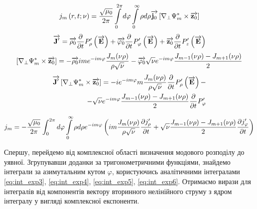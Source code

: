 \textcolor{blue} { \begin{equation*}
j_m \left( r, t; \nu \right) = \frac{\sqrt{\mu_0}}{2\pi} 
\int \limits_{0}^{2\pi} d \varphi \int \limits_0^\infty \rho d \rho 
\overrightarrow{\mathbf j_0} \left[  \nabla_\perp \Psi_m^*  \times  \overrightarrow{\mathbf z_0}  \right]
\end{equation*} }
%
\textcolor{blue} { \begin{equation*} 
\overrightarrow{\mathbf J^\prime} = 
\overrightarrow{\mathbf \rho_0}    \frac{\partial }{\partial t} P_\rho^\prime    \left( \overrightarrow{\mathbf E} \right) + 
\overrightarrow{\mathbf \varphi_0} \frac{\partial }{\partial t} P_\varphi^\prime \left( \overrightarrow{\mathbf E} \right) + 
\overrightarrow{\mathbf z_0}       \frac{\partial }{\partial t} P_z^\prime       \left( \overrightarrow{\mathbf E} \right) 
\end{equation*} }
%
\textcolor{blue} { \begin{equation*} \begin{aligned}
\left[  \nabla_\perp \Psi_m^*  \times  \overrightarrow{\mathbf z_0}  \right] =
- \overrightarrow{\mathbf \rho_0} i m e^{-im\varphi} \frac{J_m (\nu \rho)}{\rho \sqrt{\nu}}
- \overrightarrow{\mathbf \varphi_0} \sqrt{\nu} e^{-im\varphi} 
\frac{J_{m-1} (\nu \rho) - J_{m+1} (\nu \rho)}{2}
\end{aligned} \end{equation*} }
%
\textcolor{blue} { \begin{equation*} \begin{aligned}
\overrightarrow{\mathbf J^\prime} \left[  \nabla_\perp \Psi_m^*  \times  \overrightarrow{\mathbf z_0}  \right] = 
- i e^{-im\varphi} m \frac{J_m (\nu \rho)}{\rho \sqrt{\nu}}
\frac{\partial }{\partial t} P_\rho^\prime \left( \overrightarrow{\mathbf E} \right) - \\
- \sqrt{\nu} e^{-im\varphi} \frac{J_{m-1} (\nu \rho) - J_{m+1} (\nu \rho)}{2}
\frac{\partial }{\partial t} P_\varphi^\prime
\end{aligned} \end{equation*} }

\begin{equation*} \begin{aligned}
j_m = - \frac{\sqrt{\mu_0}}{2\pi} 
\int_{0}^{2\pi} d \varphi \int \limits_{0}^{\infty} \rho d \rho
e^{-im\varphi} \left( i  m \frac{J_m (\nu \rho)}{\rho \sqrt{\nu}}
\frac{\partial j_\rho^\prime}{\partial t} + \sqrt{\nu}
\frac{J_{m-1} (\nu \rho) - J_{m+1} (\nu \rho)}{2}
\frac{\partial j_\varphi^\prime}{\partial t} \right)
\end{aligned} \end{equation*}

Спершу, перейдемо від комплексної області визначення модового розподілу 
до уявної. Згрупувавши доданки за тригонометричними функціями,
знайдемо інтеграли за азимутальним кутом $ \varphi $, користуючись 
аналітичними інтегралами \eqref{eq:int_exp3}, \eqref{eq:int_exp4}, 
\eqref{eq:int_exp5}, \eqref{eq:int_exp6}. Отримаємо вирази для інтегралів
від компонентів вектору вторинного нелінійного струму з ядром інтегралу у 
вигляді комплексної експоненти.

